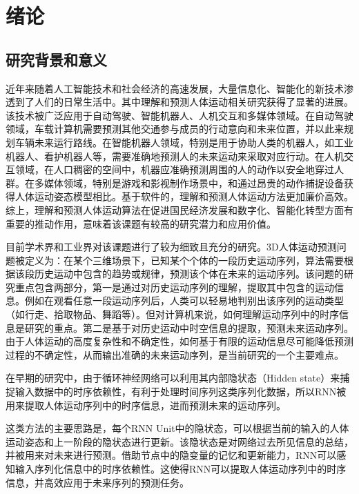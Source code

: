 \chapter{绪论}
%
\section{研究背景和意义}
\label{section:1.1}
近年来随着人工智能技术和社会经济的高速发展，大量信息化、智能化的新技术渗透到了人们的日常生活中。其中理解和预测人体运动相关研究获得了显著的进展。该技术被广泛应用于自动驾驶、智能机器人、人机交互和多媒体领域。在自动驾驶领域，车载计算机需要预测其他交通参与成员的行动意向和未来位置，并以此来规划车辆未来运行路线。在智能机器人领域，特别是用于协助人类的机器人，如工业机器人、看护机器人等，需要准确地预测人的未来运动来采取对应行动。在人机交互领域，在人口稠密的空间中，机器应准确预测周围的人的动作以安全地穿过人群。在多媒体领域，特别是游戏和影视制作场景中，和通过昂贵的动作捕捉设备获得人体运动姿态模型相比。基于软件的，理解和预测人体运动方法更加廉价高效。综上，理解和预测人体运动算法在促进国民经济发展和数字化、智能化转型方面有重要的推动作用，意味着该课题有较高的研究潜力和应用价值。

目前学术界和工业界对该课题进行了较为细致且充分的研究。3D人体运动预测问题被定义为：在某个三维场景下，已知某个个体的一段历史运动序列，算法需要根据该段历史运动中包含的趋势或规律，预测该个体在未来的运动序列。该问题的研究重点包含两部分，第一是通过对历史运动序列的理解，提取其中包含的运动信息。例如在观看任意一段运动序列后，人类可以轻易地判别出该序列的运动类型（如行走、拾取物品、舞蹈等）。但对计算机来说，如何理解运动序列中的时序信息是研究的重点。第二是基于对历史运动中时空信息的提取，预测未来运动序列。由于人体运动的高度复杂性和不确定性，如何基于有限的运动信息尽可能降低预测过程的不确定性，从而输出准确的未来运动序列，是当前研究的一个主要难点。

在早期的研究中，由于循环神经网络\parencite{zaremba2014recurrent}可以利用其内部隐状态（Hidden state）来捕捉输入数据中的时序依赖性，有利于处理时间序列这类序列化数据，所以RNN被用来提取人体运动序列中的时序信息，进而预测未来的运动序列。

这类方法的主要思路是，每个RNN Unit中的隐状态，可以根据当前的输入的人体运动姿态和上一阶段的隐状态进行更新。该隐状态是对网络过去所见信息的总结，并被用来对未来进行预测。借助节点中的隐变量的记忆和更新能力，RNN可以感知输入序列化信息中的时序依赖性。这使得RNN可以提取人体运动序列中的时序信息，并高效应用于未来序列的预测任务。

